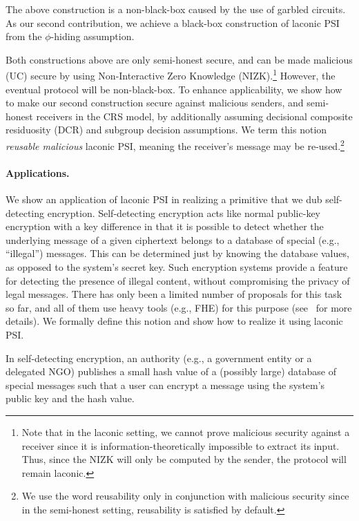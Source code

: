 The above construction is a non-black-box caused by the use of garbled circuits. As our second contribution, we achieve a black-box construction of  laconic PSI from the $\phi$-hiding assumption. 


Both constructions above are only semi-honest secure, and can be made malicious (UC) secure by using Non-Interactive Zero Knowledge (NIZK).\footnote{Note that in the laconic setting, we cannot prove malicious security against a receiver since it is information-theoretically impossible to extract its input. Thus, since the NIZK will only be computed by the sender, the protocol will remain laconic.} However, the eventual protocol will be non-black-box. To enhance applicability, we show how to make our second construction secure against  malicious senders, and semi-honest receivers in the CRS model, by additionally assuming decisional composite residuosity (DCR) and subgroup decision assumptions. We term this notion \emph{reusable malicious} laconic PSI, meaning the receiver's message may be re-used.\footnote{We use the word reusability only in conjunction with malicious security since in the semi-honest setting, reusability is satisfied by default.}


\paragraph{Applications.} We show an application of laconic PSI in realizing a primitive that we dub self-detecting encryption. Self-detecting encryption acts  like normal public-key encryption with a key difference in that it is possible to detect whether the underlying message of a given ciphertext belongs to a database of special (e.g., ``illegal”) messages. This can be determined  just by knowing the database values, as opposed to the system's secret key. Such encryption systems provide a feature for detecting the presence of illegal content, without compromising the privacy of legal messages.  There has only been a  limited number of proposals for this task so far, and  all of them use heavy tools (e.g., FHE) for this purpose (see~\cite{Green19} for more details). We formally define this notion and show how to realize it using laconic PSI. 

In self-detecting encryption, an authority (e.g., a government entity or a delegated NGO) publishes a small hash value of a (possibly  large) database of special messages such that a user can encrypt a message using the system's public key and the hash value. 

